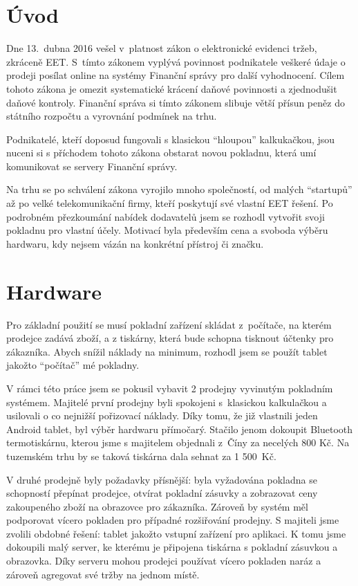 \documentclass[a4paper,11pt,oneside]{article}
\begin{document}
\pagebreak
\section{Úvod}
Dne 13.~dubna 2016\cite{eetzakon} vešel v~platnost zákon o elektronické evidenci tržeb, zkráceně EET. S~tímto zákonem vyplývá povinnost podnikatele veškeré údaje o prodeji posílat online na systémy Finanční správy pro další vyhodnocení. Cílem tohoto zákona je omezit systematické krácení daňové povinnosti a zjednodušit daňové kontroly. Finanční správa si tímto zákonem slibuje větší přísun peněz do státního rozpočtu a vyrovnání podmínek na trhu. 

Podnikatelé, kteří doposud fungovali s klasickou \enquote{hloupou} kalkukačkou, jsou nuceni si s příchodem tohoto zákona obstarat novou pokladnu, která umí komunikovat se servery Finanční správy. 

Na trhu se po schválení zákona vyrojilo mnoho společností, od malých \enquote{start\-upů} až po velké telekomunikační firmy, kteří poskytují své vlastní EET řešení. Po podrobném přezkoumání nabídek dodavatelů jsem se rozhodl vytvořit svoji pokladnu pro vlastní účely. Motivací byla především cena a svoboda výběru hardwaru, kdy nejsem vázán na konkrétní přístroj či značku.

\section{Hardware}

Pro základní použití se musí pokladní zařízení skládat z~počítače, na kterém prodejce zadává zboží, a z tiskárny, která bude schopna tisknout účtenky pro zákazníka. Abych snížil náklady na minimum, rozhodl jsem se použít tablet jakožto \enquote{počítač} mé pokladny.

V rámci této práce jsem se pokusil vybavit 2 prodejny vyvinutým pokladním systémem. Majitelé první prodejny byli spokojeni s~klasickou kalkulačkou a usilovali o co nejnižší pořizovací náklady. Díky tomu, že již vlastnili jeden Android tablet, byl výběr hardwaru přímočarý. Stačilo jenom dokoupit Bluetooth termotiskárnu, kterou jsme s majitelem objednali z~Číny za necelých 800 Kč. Na tuzemském trhu by se taková tiskárna dala sehnat za 1 500~Kč.  

V druhé prodejně byly požadavky přísnější: byla vyžadována pokladna se schopností přepínat prodejce, otvírat pokladní zásuvky a zobrazovat ceny zakoupeného zboží na obrazovce pro zákazníka. Zároveň by systém měl podporovat vícero pokladen pro případné rozšiřování prodejny. S majiteli jsme zvolili obdobné řešení: tablet jakožto vstupní zařízení pro aplikaci. K tomu jsme dokoupili malý server, ke kterému je připojena tiskárna s pokladní zásuvkou a obrazovka. Díky serveru mohou prodejci používat vícero pokladen naráz a zároveň agregovat své tržby na jednom místě.
\end{document}
